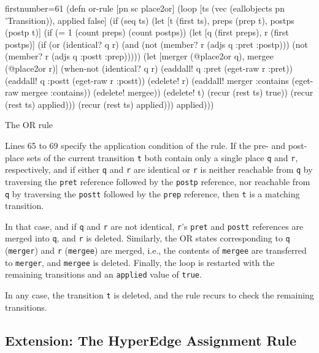 \documentclass[11pt]{article}
\begin{document}
\begin{listing}[H]
  \begin{clojurecode*}{firstnumber=61}
(defn or-rule [pn sc place2or]
  (loop [ts (vec (eallobjects pn 'Transition)), applied false]
    (if (seq ts)
      (let [t (first ts), preps (prep t), postps (postp t)]
        (if (= 1 (count preps) (count postps))
          (let [q (first preps), r (first postps)]
            (if (or (identical? q r)
                    (and (not (member? r (adjs q :pret :postp)))
                         (not (member? r (adjs q :postt :prep)))))
              (let [merger (@place2or q), mergee (@place2or r)]
                (when-not (identical? q r)
                  (eaddall! q :pret  (eget-raw r :pret))
                  (eaddall! q :postt (eget-raw r :postt))
                  (edelete! r)
                  (eaddall! merger :contains (eget-raw mergee :contains))
                  (edelete! mergee))
                (edelete! t)
                (recur (rest ts) true))
              (recur (rest ts) applied)))
          (recur (rest ts) applied)))
      applied)))
  \end{clojurecode*}
  \label{lst:or-rule}
  \caption{The OR rule}
\end{listing}

Lines 65 to 69 specify the application condition of the rule.  If the pre- and
post-place sets of the current transition \verb|t| both contain only a single
place \verb|q| and \verb|r|, respectively, and if either \verb|q| and \verb|r|
are identical or \verb|r| is neither reachable from \verb|q| by traversing the
\verb|pret| reference followed by the \verb|postp| reference, nor reachable
from \verb|q| by traversing the \verb|postt| followed by the \verb|prep|
reference, then \verb|t| is a matching transition.

In that case, and if \verb|q| and \verb|r| are not identical, \verb|r|'s
\verb|pret| and \verb|postt| references are merged into \verb|q|, and \verb|r|
is deleted.  Similarly, the OR states corresponding to \verb|q| (\verb|merger|)
and \verb|r| (\verb|mergee|) are merged, i.e., the contents of \verb|mergee|
are transferred to \verb|merger|, and \verb|mergee| is deleted.  Finally, the
loop is restarted with the remaining transitions and an \verb|applied| value of
\verb|true|.

In any case, the transition \verb|t| is deleted, and the rule recurs to check
the remaining transitions.


\subsection{Extension: The HyperEdge Assignment Rule}
\label{sec:hyperedge-rule}
\end{document}
